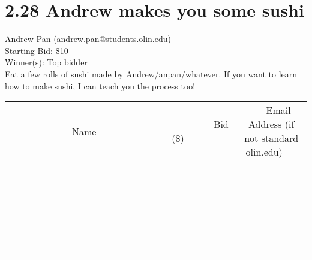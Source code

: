 \documentclass[11pt]{article}
\begin{document}
\section*{2.28 Andrew makes you some sushi}
Andrew Pan (andrew.pan@students.olin.edu) \\
Starting Bid: \$10 \\
Winner(s): 
Top bidder \\
Eat a few rolls of sushi made by Andrew/anpan/whatever.  If you want to learn how to make sushi, I can teach you the process too! \\[6ex]
\begin{tabular}{c c c}
~~~~~~~~~~~~~Name~~~~~~~~~~~~~ & ~~~~~~~~~Bid (\$)~~~~~~~~~ & ~~~Email Address (if not standard olin.edu)~~~ \\
 & & \\
\hline
 & & \\
\hline
 & & \\
\hline
 & & \\
\hline
 & & \\
\hline
 & & \\
\hline
 & & \\
\hline
 & & \\
\hline
 & & \\
\hline
 & & \\
\hline
 & & \\
\hline
 & & \\
\hline
 & & \\
\hline
 & & \\
\hline
 & & \\
\hline
 & & \\
\hline
 & & \\
\hline
 & & \\
\hline
 & & \\
\hline
 & & \\
\hline
 & & \\
\hline
 & & \\
\hline
 & & \\
\hline
 & & \\
\hline
 & & \\
\hline
 & & \\
\hline
\end{tabular}
\clearpage
\end{document}
